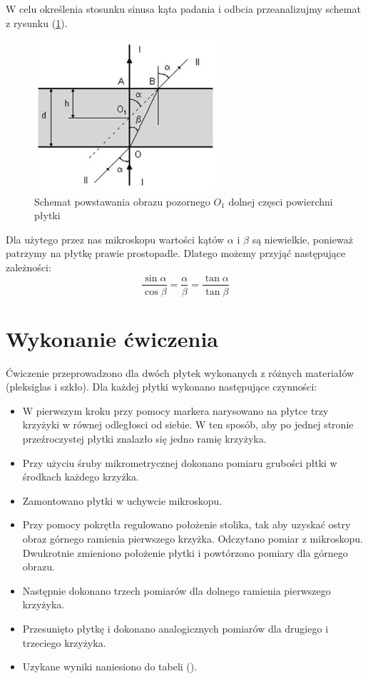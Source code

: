 \documentclass [a4paper,11pt]{article}
\begin{document}
	W celu określenia stosunku sinusa kąta padania i odbcia przeanalizujmy schemat z rysunku (\ref{fig:schemat}). 
	\begin{center}
	
			\begin{figure}[!h]
				\centering
			\label{fig:schemat}
			\caption{Schemat powstawania obrazu pozornego $O_1$ dolnej częsci powierchni płytki }
			\includegraphics[width=0.6\textwidth]{schemat_zalamanie}
		\end{figure}
	\end{center}

	
	Dla użytego przez nas mikroskopu wartości kątów $\alpha$ i $\beta$ są niewielkie, ponieważ patrzymy na płytkę prawie prostopadle. Dlatego możemy przyjąć następujące zależności:
	\begin{equation}
		\frac{\sin \alpha}{\cos \beta}=\frac{ \alpha}{ \beta}=\frac{\tan \alpha}{\tan \beta}
	\end{equation}
	
		
	\section{Wykonanie ćwiczenia}
	Ćwiczenie przeprowadzono dla dwóch płytek wykonanych z różnych materiałów (pleksiglas i szkło).
	Dla każdej płytki wykonano następujące czynności:
	\begin{itemize}
		\item W pierwszym kroku przy pomocy markera narysowano na płytce trzy krzyżyki w równej odległosci od siebie.
		W ten sposób, aby po jednej stronie przeźroczystej płytki znalazło się jedno ramię krzyżyka.
		\item 
			Przy użyciu śruby mikrometrycznej dokonano pomiaru grubości płtki w 
			środkach każdego krzyżka.
		\item Zamontowano płytki w uchywcie mikroskopu. 
		\item Przy pomocy pokrętła regulowano położenie stolika, tak aby uzyskać ostry obraz 
		górnego ramienia pierwszego krzyżka.  Odczytano pomiar z mikroskopu. Dwukrotnie zmieniono położenie płytki i powtórzono pomiary dla górnego obrazu.
		\item Następnie dokonano trzech pomiarów dla dolnego ramienia pierwszego krzyżyka.
		\item Przesunięto płytkę i dokonano analogicznych pomiarów dla drugiego i trzeciego krzyżyka.
		\item Uzykane wyniki naniesiono do tabeli ().  
	\end{itemize}
	
\end{document}
